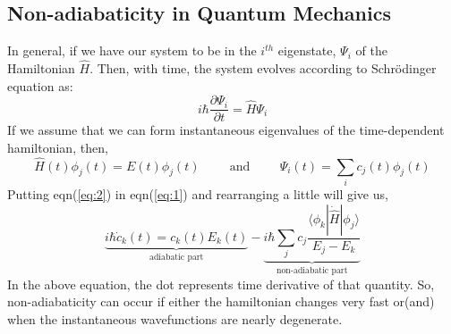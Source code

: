 \documentclass[12pt]{article}
\begin{document}
\subsection{Non-adiabaticity in Quantum Mechanics}
In general, if we have our system to be in the $i^{th}$ eigenstate, $\Psi_i$ of the Hamiltonian $\hat{H}$. 	Then, with time, the system evolves according to Schr\"{o}dinger equation as:
\begin{equation}\label{eq:1}
i\hbar\frac{\partial \Psi_i}{\partial t} = \hat{H}\Psi_i
\end{equation}
If we assume that we can form instantaneous eigenvalues of the time-dependent hamiltonian, then,
\begin{equation}\label{eq:2}
\hat{H}(t)\phi_j(t) = E(t)\phi_j(t) \hspace{1cm} \text{and} \hspace{1cm} \Psi_i(t) = \sum_i c_j(t)\phi_j(t)
\end{equation}
Putting eqn(\ref{eq:2}) in eqn(\ref{eq:1}) and rearranging a little will give us,
\begin{equation}\label{eq:3}
\underbrace{i\hbar\dot{c}_k(t) = c_k(t)E_k(t)}_\text{adiabatic part} - \underbrace{i\hbar \sum_jc_j\frac{\langle\phi_k|\dot{\hat{H}}|\phi_j\rangle}{E_j-E_k}}_\text{non-adiabatic part}
\end{equation}
In the above equation, the dot represents time derivative of that quantity. So, non-adiabaticity can occur if either the hamiltonian changes very fast or(and) when the instantaneous wavefunctions are nearly degenerate.
\end{document}
